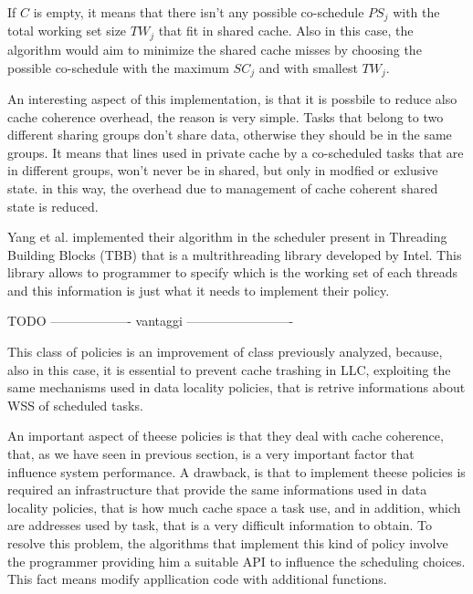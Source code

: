 If $C$ is empty, it means that there isn't any possible co-schedule $PS_j$ with the total working set size $TW_j$ that fit in shared cache. Also in this 
case, the algorithm would aim to minimize the shared cache misses by choosing the possible co-schedule with the maximum $SC_j$ and with smallest $TW_j$.

An interesting aspect of this implementation, is that it is possbile to reduce also cache coherence overhead, the reason is very simple. Tasks that belong 
to two different sharing groups don't share data, otherwise they should be in the same groups. It means that lines used in private cache by
a co-scheduled tasks that are in different groups, won't never be in shared, but only in modfied or exlusive state. in this way, the overhead due to 
management of cache coherent shared state is reduced. 

Yang et al. implemented their algorithm in the scheduler present in Threading Building Blocks (TBB) that is a multrithreading library developed by Intel. 
This library allows to programmer to specify which is the working set of each threads and this information is just what it needs to implement their policy. 

TODO ------------------- vantaggi -------------------------

This class of policies is an improvement of class previously analyzed, because, also in this case, it is essential to prevent cache trashing in LLC,
exploiting the same mechanisms used in data locality policies, that is retrive informations about WSS of scheduled tasks.

An important aspect of theese policies is that they deal with cache coherence, that, as we have seen in previous section, is a very important factor that 
influence system performance. A drawback, is that to implement theese policies is required an infrastructure that provide the same informations used in 
data locality policies, that is how much cache space a task use, and in addition, which are addresses used by task, that is a very difficult information
to obtain. To resolve this problem, the algorithms that implement this kind of policy involve the programmer providing him a suitable API to influence the 
scheduling choices. This fact means modify appllication code with additional functions.

